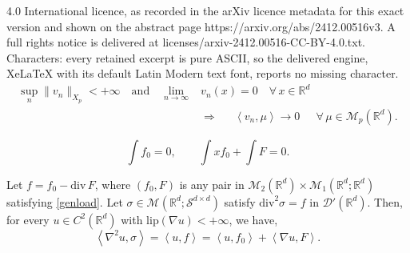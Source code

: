 \documentclass[10pt,a4paper]{amsart}
\newcommand{\D}{\mathcal{D}}
\newcommand{\Lip}{{\mathrm{lip}}}
\newcommand{\Mes}{{\mathcal{M}}}
\newcommand{\R}{\mathbb{R}}
\newcommand{\Sdd}{{\mathcal{S}^{d \times d}}}
\newcommand{\dive}{{\mathrm{div}}}
\newcommand{\pairing}[1]{{\left \langle #1 \right \rangle}}
\begin{document}
4.0 International licence, as recorded in the arXiv licence metadata for this exact version and shown on the abstract page https://arxiv.org/abs/2412.00516v3. A full rights notice is delivered at licenses/arxiv-2412.00516-CC-BY-4.0.txt. Characters: every retained excerpt is pure ASCII, so the delivered engine, XeLaTeX with its default Latin Modern text font, reports no missing character.
\begin{align}\label{domiCV}
\sup_n \| v_n\|_{X_p} <+\infty \quad \text{and}\quad \lim_{n\to \infty} & v_n(x) =0 \quad \forall \,x\in\R^d \\
\nonumber
 &\Rightarrow \quad \ \ \pairing{v_n,\mu}  \to 0 \quad \ \ 
 \forall\, \mu\in\Mes_p(\R^d) .
\end{align}

\begin{equation}\label{genload}
  \int f_0=0, \qquad  {\int x f_0 + \int F=0
} .
\end{equation}

\begin{lemma}\label{lemma:byparts}  Let  $f = f_0 - \dive\, F$, where
 $(f_0, F)$ is any pair in $\Mes_2(\R^d)\times\Mes_1(\R^d;\R^d)$ satisfying \eqref{genload}. Let $\sigma \in \Mes(\R^d;\Sdd)$ 
 satisfy  $\dive^2 \sigma = f$ in  $\D'(\R^d)$.
 Then, for every $u\in C^2(\R^d)$ with $\Lip(\nabla u)<+\infty$, we have,
\begin{equation}\label{Rd-byparts}
 { \pairing {\nabla^2 u, \sigma}}  =   \pairing{u,f}  = \pairing{u,f_0} + \pairing{\nabla u, F}.
\end{equation}
\end{lemma}
\end{document}

